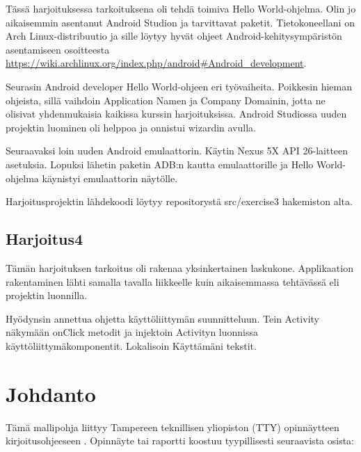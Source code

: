 \documentclass[globalnumbering,centeredcaptions,draftfooter]{tutthesis/tutthesis} %
\begin{document}
Tässä harjoituksessa tarkoituksena oli tehdä toimiva Hello World-ohjelma. Olin jo aikaisemmin asentanut Android Studion ja tarvittavat paketit. Tietokoneellani on Arch Linux-distribuutio ja sille löytyy hyvät ohjeet Android-kehitysympäristön asentamiseen osoitteesta \url{https://wiki.archlinux.org/index.php/android#Android_development}.

Seurasin Android developer Hello World-ohjeen eri työvaiheita. Poikkesin hieman ohjeista, sillä vaihdoin Application Namen ja Company Domainin, jotta ne olisivat yhdenmukaisia kaikissa kurssin harjoituksissa. Android Studiossa uuden projektin luominen oli helppoa ja onnistui wizardin avulla.

Seuraavaksi loin uuden Android emulaattorin. Käytin Nexus 5X API 26-laitteen asetuksia. Lopuksi lähetin paketin ADB:n kautta emulaattorille ja Hello World-ohjelma käynistyi emulaattorin näytölle.

Harjoitusprojektin lähdekoodi löytyy repositorystä src/exercise3 hakemiston alta.

\section{Harjoitus4}

Tämän harjoituksen tarkoitus oli rakenaa yksinkertainen laskukone. Applikaation rakentaminen lähti samalla tavalla liikkeelle kuin aikaisemmassa tehtävässä eli projektin luonnilla.

Hyödynsin annettua ohjetta käyttöliittymän suunnitteluun. Tein Activity näkymään onClick metodit ja injektoin Activityn luonnissa käyttöliittymäkomponentit. Lokalisoin Käyttämäni tekstit.


\chapter{Johdanto}
\label{ch:johdanto}

Tämä mallipohja liittyy Tampereen teknillisen yliopiston (TTY) opinnäytteen kirjoitusohjeeseen \citep{Tty2017}.
Opinnäyte tai raportti koostuu tyypillisesti seuraavista osista:
\end{document}
